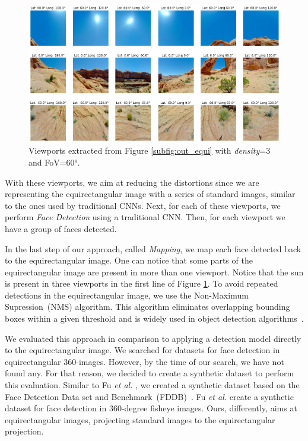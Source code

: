 \begin{figure}[!ht]
    \centering
    \includegraphics[width=1\linewidth]{img/video360/viewports.png}
    \caption{Viewports extracted from Figure \ref{subfig:out_equi} with \emph{density}=3 and FoV=60°.}
    \label{fig:authoring_viewports}
\end{figure}

With these viewports, we aim at reducing the distortions since we are representing the equirectangular image with a series of standard images, similar to the ones used by traditional CNNs. Next, for each of these viewports, we perform \emph{Face Detection} using a traditional CNN. Then, for each viewport we have a group of faces detected.

In the last step of our approach, called \emph{Mapping}, we map each face detected back to the equirectangular image. One can notice that some parts of the equirectangular image are present in more than one viewport. Notice that the sun is present in three viewports in the first line of Figure \ref{fig:authoring_viewports}. To avoid repeated detections in the equirectangular image, we use the Non-Maximum Supression~(NMS) algorithm. This algorithm eliminates overlapping bounding boxes within a given threshold and is widely used in object detection algorithms~\cite{nms1, nms2, nms3, nms4, nms5}.

We evaluated this approach in comparison to applying a detection model directly to the equirectangular image. We searched for datasets for face detection in equirectangular 360-images. However, by the time of our search, we have not found any. For that reason, we decided to create a synthetic dataset to perform this evaluation. 
Similar to Fu \emph{et al.} \cite{fu2019fddb}, we created a synthetic dataset based on the Face Detection Data set and Benchmark~(FDDB)~\cite{jain2010fddb}. Fu \emph{et al.} \cite{fu2019fddb} create a synthetic dataset for face detection in 360-degree fisheye images. Ours, differently, aims at equirectangular images, projecting standard images to the equirectangular projection.

